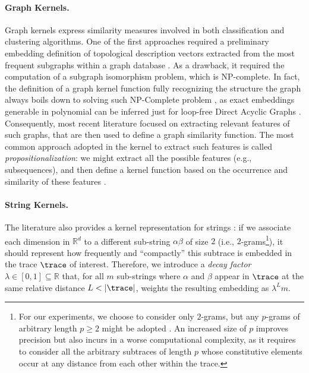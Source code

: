 \paragraph*{Graph Kernels.} Graph kernels express similarity measures \cite{Samatova} involved in both classification \cite{TsudaS10} and clustering algorithms. One of the first approaches required a preliminary embedding definition of topological description vectors extracted from the most frequent subgraphs within a graph database \cite{Sidere}. As a drawback, it required the computation of a subgraph isomorphism problem, which is NP-complete. In fact, the definition of a graph kernel function fully recognizing the structure the graph always boils down to solving such NP-Complete problem \cite{GartnerFW03}, as exact embeddings generable in polynomial can be inferred just for loop-free Direct Acyclic Graphs \cite{BergamiBM20}. Consequently, most recent literature focused on extracting relevant features of such graphs, that are then used to define a graph similarity function. The most common approach adopted in the kernel to extract such features is called \textit{propositionalization}: we might extract all the possible features (e.g., subsequences), and then define a kernel function based on the occurrence and similarity of these features \cite{Gartner03}.

\paragraph*{String Kernels.} The literature also provides a kernel representation for strings \cite{LodhiSSCW02,GartnerFW03}: if we associate each dimension in $\mathbb{R}^d$ to a different sub-string $\alpha\beta$ of size $2$ (i.e., $2$-grams\footnote{\label{fn:caveat}For our experiments, we choose to consider only $2$-grams, but any $p$-grams of arbitrary length $p\geq 2$ might be adopted \cite{Gartner03}. An increased size of $p$ improves precision but also incurs in a worse computational complexity, as it requires to consider all the arbitrary subtraces of length $p$ whose constitutive elements occur at any distance from each other within the trace.}), it should represent how frequently and ``compactly'' this subtrace is embedded in the trace $\trace$ of interest. Therefore, we introduce a \emph{decay factor} $\lambda\in[0,1]\subseteq\mathbb{R}$ that, for all $m$ sub-strings where $\alpha$ and $\beta$ appear in $\trace$ at the same relative distance $L < |\trace|$, weights the resulting embedding as $\lambda^Lm$.



